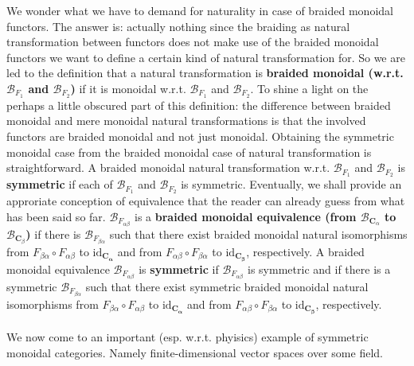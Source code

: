 We wonder what we have to demand for naturality in case of braided monoidal functors. The answer is: actually nothing since the braiding as natural transformation between functors does not make use of the braided monoidal functors we want to define a certain kind of natural transformation for. So we are led to the definition that a natural transformation is \textbf{braided monoidal (w.r.t. $\mathcal{B}_{F_{1}}$ and $\mathcal{B}_{F_{2}}$)} if it is monoidal w.r.t. $\mathcal{B}_{F_{1}}$ and $\mathcal{B}_{F_{2}}$. To shine a light on the perhaps a little obscured part of this definition: the difference between braided monoidal and mere monoidal natural transformations is that the involved functors are braided monoidal and not just monoidal. Obtaining the symmetric monoidal case from the braided monoidal case of natural transformation is straightforward. A braided monoidal natural transformation w.r.t. $\mathcal{B}_{F_{1}}$ and $\mathcal{B}_{F_{2}}$ is \textbf{symmetric} if each of $\mathcal{B}_{F_{1}}$ and $\mathcal{B}_{F_{2}}$ is symmetric. Eventually, we shall provide an approriate conception of equivalence that the reader can already guess from what has been said so far. $\mathcal{B}_{F_{\alpha\beta}}$ is a \textbf{braided monoidal equivalence (from $\mathcal{B}_{\mathbf{C}_{\alpha}}$ to $\mathcal{B}_{\mathbf{C}_{\beta}}$)} if there is $\mathcal{B}_{F_{\beta\alpha}}$ such that there exist braided monoidal natural isomorphisms from $F_{\beta\alpha} \circ F_{\alpha\beta}$ to $\mathrm{id}_{\mathbf{C_{\alpha}}}$ and from $F_{\alpha\beta} \circ F_{\beta\alpha}$ to $\mathrm{id}_{\mathbf{C_{\beta}}}$, respectively. A braided monoidal equivalence $\mathcal{B}_{F_{\alpha\beta}}$ is \textbf{symmetric} if $\mathcal{B}_{F_{\alpha\beta}}$ is symmetric and if there is a symmetric $\mathcal{B}_{F_{\beta\alpha}}$ such that there exist symmetric braided monoidal natural isomorphisms from $F_{\beta\alpha} \circ F_{\alpha\beta}$ to $\mathrm{id}_{\mathbf{C_{\alpha}}}$ and from $F_{\alpha\beta} \circ F_{\beta\alpha}$ to $\mathrm{id}_{\mathbf{C_{\beta}}}$, respectively.
\\\\
We now come to an important (esp. w.r.t. phyisics) example of symmetric monoidal categories. Namely finite-dimensional vector spaces over some field.
\\
